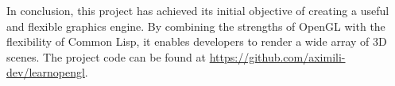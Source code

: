 
\label{SEC:CONCLUSIONS}


In conclusion,
this project has achieved its initial objective of creating a useful and flexible graphics engine.
By combining the strengths of OpenGL with the flexibility of Common Lisp,
it enables developers to render a wide array of 3D scenes.
The project code can be found at \url{https://github.com/aximili-dev/learnopengl}.
